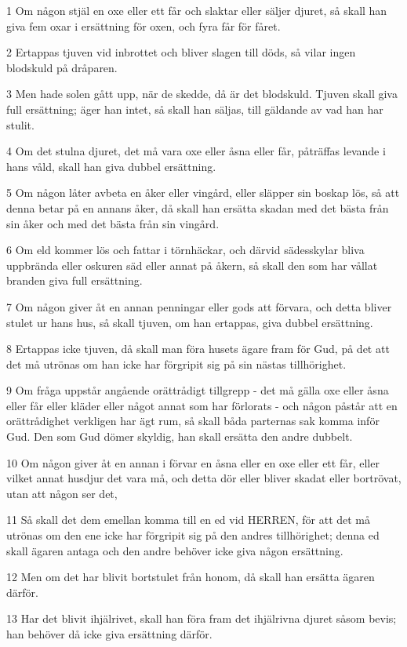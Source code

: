 \par 1 Om någon stjäl en oxe eller ett får och slaktar eller säljer djuret, så skall han giva fem oxar i ersättning för oxen, och fyra får för fåret.
\par 2 Ertappas tjuven vid inbrottet och bliver slagen till döds, så vilar ingen blodskuld på dråparen.
\par 3 Men hade solen gått upp, när de skedde, då är det blodskuld. Tjuven skall giva full ersättning; äger han intet, så skall han säljas, till gäldande av vad han har stulit.
\par 4 Om det stulna djuret, det må vara oxe eller åsna eller får, påträffas levande i hans våld, skall han giva dubbel ersättning.
\par 5 Om någon låter avbeta en åker eller vingård, eller släpper sin boskap lös, så att denna betar på en annans åker, då skall han ersätta skadan med det bästa från sin åker och med det bästa från sin vingård.
\par 6 Om eld kommer lös och fattar i törnhäckar, och därvid sädesskylar bliva uppbrända eller oskuren säd eller annat på åkern, så skall den som har vållat branden giva full ersättning.
\par 7 Om någon giver åt en annan penningar eller gods att förvara, och detta bliver stulet ur hans hus, så skall tjuven, om han ertappas, giva dubbel ersättning.
\par 8 Ertappas icke tjuven, då skall man föra husets ägare fram för Gud, på det att det må utrönas om han icke har förgripit sig på sin nästas tillhörighet.
\par 9 Om fråga uppstår angående orättrådigt tillgrepp - det må gälla oxe eller åsna eller får eller kläder eller något annat som har förlorats - och någon påstår att en orättrådighet verkligen har ägt rum, så skall båda parternas sak komma inför Gud. Den som Gud dömer skyldig, han skall ersätta den andre dubbelt.
\par 10 Om någon giver åt en annan i förvar en åsna eller en oxe eller ett får, eller vilket annat husdjur det vara må, och detta dör eller bliver skadat eller bortrövat, utan att någon ser det,
\par 11 Så skall det dem emellan komma till en ed vid HERREN, för att det må utrönas om den ene icke har förgripit sig på den andres tillhörighet; denna ed skall ägaren antaga och den andre behöver icke giva någon ersättning.
\par 12 Men om det har blivit bortstulet från honom, då skall han ersätta ägaren därför.
\par 13 Har det blivit ihjälrivet, skall han föra fram det ihjälrivna djuret såsom bevis; han behöver då icke giva ersättning därför.
